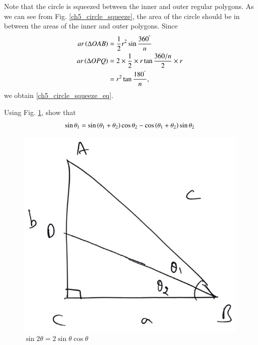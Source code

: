 \proof Note that the circle is squeezed between the inner and outer regular polygons.  As we can see from Fig. \ref{ch5_circle_squeeze}, the area of the circle should be in between the areas of the inner and outer polygons.  Since
%
\begin{align}
ar \left(\Delta OAB\right) &= \frac{1}{2}r^{2}\sin\frac{360^{\degree}}{n} \\
ar \left(\Delta OPQ\right) &= 2 \times \frac{1}{2} \times r \tan\frac{360/n}{2} \times r \\
&= r^{2}\tan\frac{180^{\degree}}{n},
\end{align}
%
we obtain \eqref{ch5_circle_squeeze_eq}.
%
%
\begin{problem}
	Using Fig. \ref{ch5_sin_theta}, show that 
\begin{equation}
\label{ch5_sin_theta_eq}
\sin  \theta_1 = \sin \left(\theta_1 + \theta_2\right)\cos \theta_2 - \cos\left(\theta_1+\theta_2\right)\sin\theta_2
\end{equation}	
\end{problem}
\begin{figure}[!h]
	\begin{center}
		
		\includegraphics[width=\columnwidth]{./figs/ch5_sin_theta}
		\vspace*{-10cm}
	\end{center}
	\caption{$\sin2\theta = 2\sin\theta\cos\theta$}
	\label{ch5_sin_theta}	
\end{figure}
%

